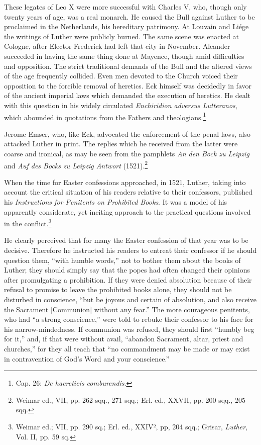 These legates of Leo X were more successful with Charles V, who,
though only twenty years of age, was a real monarch. He caused
the Bull against Luther to be proclaimed in the Netherlands, his
hereditary patrimony. At Louvain and Liége the writings of Luther
were publicly burned. The same scene was enacted at Cologne, after
Elector Frederick had left that city in November. Aleander succeeded
in having the same thing done at Mayence, though amid difficulties
and opposition. The strict traditional demands of the Bull and the
altered views of the age frequently collided. Even men devoted to
the Church voiced their opposition to the forcible removal of heretics.
Eck himself was decidedly in favor of the ancient imperial laws
which demanded the execution of heretics. He dealt with this question
in his widely circulated \textit{Enchiridion adversus Lutteranos}, which
abounded in quotations from the Fathers and theologians.\footnote
{Cap. 26: \textit{De haereticis comburendis}.}

Jerome Emser, who, like Eck, advocated the enforcement of the
penal laws, also attacked Luther in print. The replies which he received
from the latter were coarse and ironical, as may be seen from
the pamphlets \textit{An den Bock zu Leipzig} and \textit{Auf des Bocks zu Leipzig
Antwort} (1521).\footnote{Weimar ed., VII, pp. 262 sqq., 271 sqq.; Erl. ed., XXVII, pp. 200 sqq., 205 sqq.}

When the time for Easter confessions approached, in 1521, Luther,
taking into account the critical situation of his readers relative to
their confessors, published his \textit{Instructions for Penitents on Prohibited
Books}. It was a model of his apparently considerate, yet inciting approach
to the practical questions involved in the conflict.\footnote{Weimar ed.; VII, pp. 290 sq.; Erl. ed., XXIV², pp, 204 sqq.; Grisar, \textit{Luther}, Vol. II,
pp. 59 sq.}

He clearly perceived that for many the Easter confession of that year
was to be decisive. Therefore he instructed his readers to entreat their
confessor if he should question them, “with humble words,” not to bother them
about the books of Luther; they should simply say that the popes had often
changed their opinions after promulgating a prohibition. If they were denied
absolution because of their refusal to promise to leave the prohibited books
alone, they should not be disturbed in conscience, “but be joyous and certain
of absolution, and also receive the Sacrament [Communion] without any
fear.” The more courageous penitents, who had “a strong conscience,” were
told to rebuke their confessor to his face for his narrow-mindedness. If communion
was refused, they should first “humbly beg for it,” and, if that were
without avail, “abandon Sacrament, altar, priest and churches,” for they
all teach that “no commandment may be made or may exist in contravention
of God’s Word and your conscience.”

